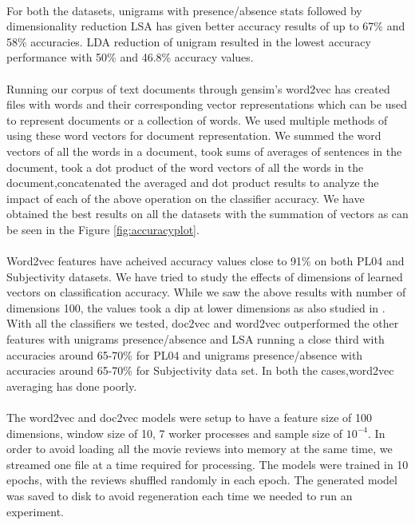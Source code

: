 \documentclass[a4paper,26pt]{article}
\begin{document}
\paragraph{}
For both the datasets, unigrams with presence/absence stats followed by dimensionality reduction LSA has given better accuracy results of up to 67\% and 58\% accuracies. LDA reduction of unigram resulted in the lowest accuracy performance with 50\% and 46.8\% accuracy values. 

\paragraph{}
Running our corpus of text documents through gensim's word2vec has created files with words and their corresponding vector representations which can be used to represent documents or a collection of words. We used multiple methods of using these word vectors for document representation. We summed the word vectors of all the words in a document, took sums of averages of sentences in the document, took a dot product of the word vectors of all the words in the document,concatenated the averaged and dot product results to analyze the impact of each of the above operation on the classifier accuracy. We have obtained the best results on all the datasets with the summation of vectors as can be seen in the Figure \ref{fig:accuracyplot}.

\paragraph{}
Word2vec features have acheived accuracy values close to 91\% on both PL04 and Subjectivity datasets. We have tried to study the effects of dimensions of learned vectors on classification accuracy. While we saw the above results with number of dimensions 100, the values took a dip at lower dimensions as also studied in \cite{dai2015document}. With all the classifiers we tested, doc2vec and word2vec outperformed the other features with unigrams presence/absence and LSA running a close third with accuracies around 65-70\% for PL04 and unigrams presence/absence with accuracies around 65-70\% for Subjectivity data set. In both the cases,word2vec averaging has done poorly.  

\paragraph{}
The word2vec and doc2vec models were setup to have a feature size of 100 dimensions, window size of 10, 7 worker processes and sample size of $10^{-4}$. In order to avoid loading all the movie reviews into memory at the same time, we streamed one file at a time required for processing. The models were trained in 10 epochs, with the reviews shuffled randomly in each epoch. The generated model was saved to disk to avoid regeneration each time we needed to run an experiment. 
\end{document}

